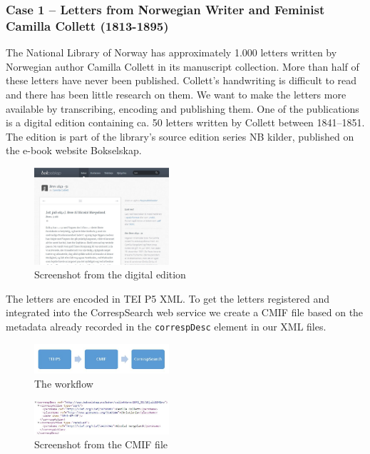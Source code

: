 \documentclass[runningheads]{llncs}
\begin{document}
\subsubsection{Case 1 -- Letters from Norwegian Writer and Feminist
Camilla Collett
(1813-1895)}
The National Library of Norway has approximately 1.000 letters written
by  Norwegian author Camilla Collett in its manuscript
collection. More than half of these letters have never been published.
Collett's handwriting is difficult to read and there has been little
research on them. We want to make the letters more
available by transcribing, encoding and publishing them. One of the
publications is a digital edition containing ca. 50 letters
written by Collett between 1841–1851. The edition is part of the
library's source edition series NB kilder, published on the e-book
website Bokselskap.~\cite{url_boks}

\begin{figure}[h!]
\centering
\includegraphics[width=50mm]{CC_BS.jpg}
\caption{Screenshot from the digital edition} \label{fig1}
\end{figure}

The letters are encoded in TEI P5 XML. To get the letters registered and
integrated into the CorrespSearch web service we create a CMIF file
based on the metadata already recorded in the \texttt{correspDesc}
element in our XML files.

\begin{figure}[h!]
\centering
\includegraphics[width=50mm]{TEI-CMIF.jpg}
\caption{The workflow} \label{fig2}
\end{figure}

\begin{figure}[h!]
\centering
\includegraphics[width=50mm]{correspDesc.jpg}
\caption{Screenshot from the CMIF file} \label{fig3}
\end{figure}
\end{document}
